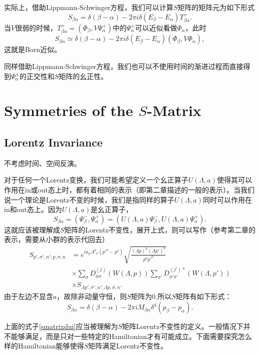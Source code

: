 \documentclass[9pt]{extbook}
\begin{document}
实际上，借助Lippmann-Schwinger方程，我们可以计算$S$矩阵的矩阵元为如下形式
\[
S_{\beta\alpha}=\delta(\beta-\alpha)-2\pi i\delta(E_\beta-E_\alpha)T^+_{\beta\alpha}.
\]
当$V$很弱的时候，$T^+_{\beta\alpha}=(\Phi_\beta,V\Psi^+_\alpha)$中的$\Psi^+_\alpha$可以近似看做$\Phi_\alpha$，此时
\[
S_{\beta\alpha}\simeq\delta(\beta-\alpha)-2\pi i\delta(E_\beta-E_\alpha)(\Phi_\beta,V\Phi_\alpha),
\]
这就是Born近似。

同样借助Lippmann-Schwinger方程，我们也可以不使用时间的渐进过程而直接得到$\Psi_\alpha^\pm$的正交性和$S$矩阵的幺正性。

\section{Symmetries of the $S$-Matrix}
\subsection*{Lorentz Invariance}
不考虑时间、空间反演。

对于任何一个Lorentz变换，我们可能希望定义一个幺正算子$U(\Lambda,a)$使得其可以作用在in或out态上时，都有着相同的表示（即第二章描述的一般的表示）。当我们说一个理论是Lorentz不变的时候，我们是指同样的算子$U(\Lambda,a)$同时可以作用在in和out态上。因为$U(\Lambda,a)$是幺正算子，
\[
S_{\beta\alpha}=\left(\Psi_\beta^-,\Psi_\alpha^+\right)=\left(U(\Lambda,a)\Psi_\beta^-,U(\Lambda,a)\Psi_\alpha^+\right).
\]
这就应该被理解成$S$矩阵的Lorentz不变性，展开上式，则可以写作（参考第二章的表示，需要从小群的表示代回去）
\begin{equation}
\label{smatrixdui}
\begin{split}
	S_{p',\sigma',n';p,\sigma,n}&=e^{ia_\mu\Lambda^\mu_{\phantom{\mu}\nu}(p'^\nu-p^\nu)}\sqrt{\frac{(\Lambda p)^0 (\Lambda p')^0}{p^0p'^0}}\\
	&\times\sum_{\bar{\sigma}} D^{(j)}_{\bar{\sigma}\sigma}(W(\Lambda,p))\sum_{\bar{\sigma}'} D^{(j')*}_{\bar{\sigma}'\sigma'}(W(\Lambda,p'))\\
	&\times S_{\Lambda p',\bar{\sigma}',n';\Lambda p,\bar{\sigma},n}.
\end{split}
\end{equation}
由于左边不显含$a$，故除非动量守恒，则$S$矩阵为0.所以$S$矩阵有如下形式：
\[
S_{\beta\alpha}=\delta(\beta-\alpha)-2\pi iM_{\beta\alpha}\delta^4(p_\beta-p_\alpha).
\]

上面的式子\eqref{smatrixdui}应当被理解为$S$矩阵Lorentz不变性的定义。一般情况下并不能够满足，而是只对一些特定的Hamiltonian才有可能成立。下面需要探究怎么样的Hamiltonian能够使得$S$矩阵满足Lorentz不变性。
\end{document}
